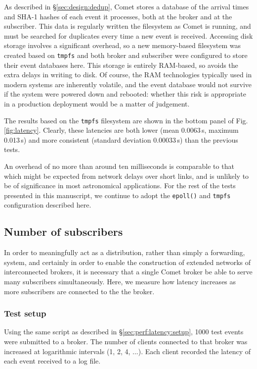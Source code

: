 \documentclass[5p,authoryear]{elsarticle}
\begin{document}
As described in \S\ref{sec:design:dedup}, Comet stores a database of the
arrival times and SHA-1 hashes of each event it processes, both at the broker
and at the subscriber. This data is regularly written the filesystem as Comet
is running, and must be searched for duplicates every time a new event is
received. Accessing disk storage involves a significant overhead, so a new
memory-based filesystem was created based on \texttt{tmpfs}
\citep{Kerrisk:2014} and both broker and subscriber were configured to store
their event databases here. This storage is entirely RAM-based, so avoids the
extra delays in writing to disk. Of course, the RAM technologies typically
used in modern systems are inherently volatile, and the event database would
not survive if the system were powered down and rebooted: whether this risk is
appropriate in a production deployment would be a matter of judgement.

The results based on the \texttt{tmpfs} filesystem are shown in the bottom
panel of Fig. \ref{fig:latency}. Clearly, these latencies are both lower (mean
0.0063\,s, maximum 0.013\,s) and more consistent (standard deviation
0.00033\,s) than the previous tests.

An overhead of no more than around ten milliseconds is comparable to that
which might be expected from network delays over short links, and is unlikely
to be of significance in most astronomical applications. For the rest of the
tests presented in this manuscript, we continue to adopt the \texttt{epoll()}
and \texttt{tmpfs} configuration described here.

\subsection{Number of subscribers}

In order to meaningfully act as a distribution, rather than simply a
forwarding, system, and certainly in order to enable the construction of
extended networks of interconnected brokers, it is necessary that a single
Comet broker be able to serve many subscribers simultaneously. Here, we
measure how latency increases as more subscribers are connected to the the
broker.

\subsubsection{Test setup}

Using the same script as described in \S\ref{sec:perf:latency:setup}, 1000
test events were submitted to a broker. The number of clients connected to
that broker was increased at logarithmic intervals (1, 2, 4, ...). Each client
recorded the latency of each event received to a log file.
\end{document}
